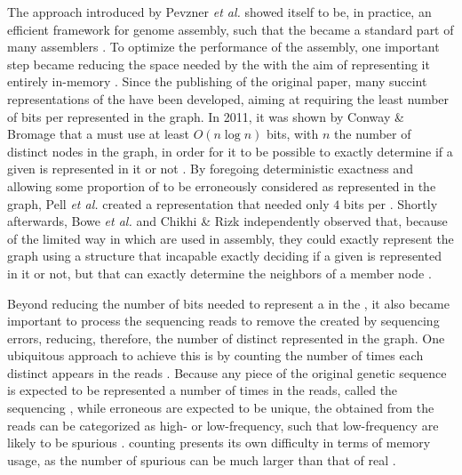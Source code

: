 The approach introduced by Pevzner \emph{et al.} showed itself to be, in practice, an efficient framework for genome assembly, such that the \dBG became a standard part of many assemblers \cite{Chikhi2014}. To optimize the performance of the assembly, one important step became reducing the space needed by the \dBG with the aim of representing it entirely in-memory \cite{Chikhi2014}. Since the publishing of the original paper, many succint representations of the \dBG have been developed, aiming at requiring the least number of bits per \kmer represented in the graph. In 2011, it was shown by Conway \& Bromage that a \dBG must use at least $O(n \log n)$ bits, with $n$ the number of distinct nodes in the graph, in order for it to be possible to exactly determine if a given \kmer is represented in it or not \cite{Conway2011}. By foregoing deterministic exactness and allowing some proportion of  to be erroneously considered as represented in the graph, Pell \emph{et al.} created a representation that needed only $4$ bits per \kmer \cite{Pell2012}. Shortly afterwards, Bowe \emph{et al.} and Chikhi \& Rizk independently observed that, because of the limited way in which  are used in assembly, they could exactly represent the graph using a structure that incapable exactly deciding if a given \kmer is represented in it or not, but that can exactly determine the neighbors of a member node \cite{Bowe2012}\cite{Chikhi2013}.

Beyond reducing the number of bits needed to represent a \kmer in the \dBG, it also became important to process the sequencing reads to remove the  created by sequencing errors, reducing, therefore, the number of distinct  represented in the graph. One ubiquitous approach to achieve this is by counting the number of times each distinct  appears in the reads \cite{Zhang2014}. Because any piece of the original genetic sequence is expected to be represented a number of times in the reads, called the sequencing , while erroneous  are expected to be unique, the  obtained from the reads can be categorized as high- or low-frequency, such that low-frequency  are likely to be spurious \cite{Conway2011}\cite{Ghosh2019}. \kmer counting presents its own difficulty in terms of memory usage, as the number of spurious  can be much larger than that of real  \cite{Conway2011}\cite{Melsted2011}\cite{Zhang2014}\cite{Ghosh2019}.

